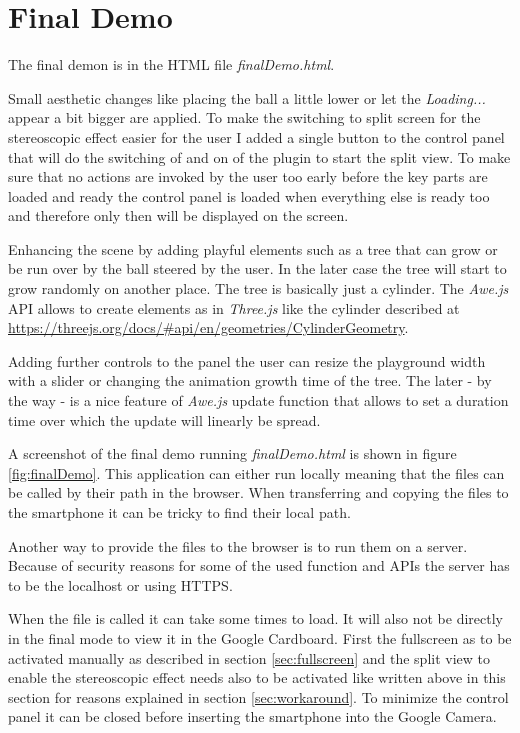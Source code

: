 \section{Final Demo}

The final demon is in the HTML file \textit{finalDemo.html}.

Small aesthetic changes like placing the ball a little lower or let the \textit{Loading...} appear a bit bigger are applied. To make the switching to split screen for the stereoscopic effect easier for the user I added a single button to the control panel that will do the switching of and on of the plugin to start the split view. 
To make sure that no actions are invoked by the user too early before the key parts are loaded and ready the control panel is loaded when everything else is ready too and therefore only then will be displayed on the screen.

Enhancing the scene by adding playful elements such as a tree that can grow or be run over by the ball steered by the user. In the later case the tree will start to grow randomly on another place. The tree is basically just a cylinder. The \textit{Awe.js} API allows to create elements as in \textit{Three.js} like the cylinder described at \url{https://threejs.org/docs/\#api/en/geometries/CylinderGeometry}.

Adding further controls to the panel the user can resize the playground width with a slider or changing the animation growth time of the tree. The later - by the way - is a nice feature of \textit{Awe.js} update function that allows to set a duration time over which the update will linearly be spread.

A screenshot of the final demo running \textit{finalDemo.html} is shown in figure \ref{fig:finalDemo}. This application can either run locally meaning that the files can be called by their path in the browser. When transferring and copying the files to the smartphone it can be tricky to find their local path. 

Another way to provide the files to the browser is to run them on a server. Because of security reasons for some of the used function and APIs the server has to be the localhost or using HTTPS.

When the file is called it can take some times to load. It will also not be directly in the final mode to view it in the Google Cardboard. First the fullscreen as to be activated manually as described in section \ref{sec:fullscreen} and the split view to enable the stereoscopic effect needs also to be activated like written above in this section for reasons explained in section \ref{sec:workaround}. To minimize the control panel it can be closed before inserting the smartphone into the Google Camera.

